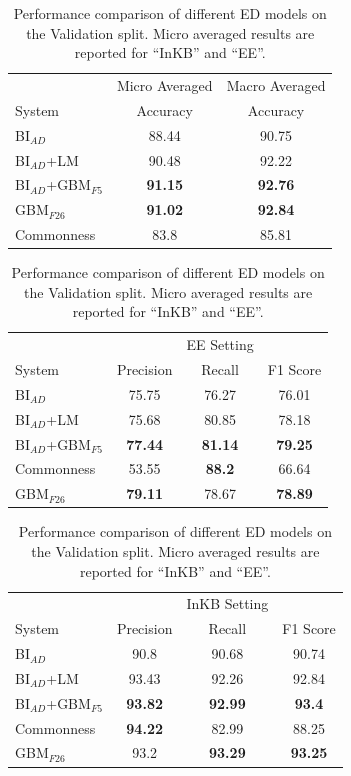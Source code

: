 \documentclass{report}
\theoremstyle{definition}
\theoremstyle{remark}
\begin{document}
\begin{table}
    \centering
    \begin{tabular}{lcc}
    &Micro Averaged & Macro Averaged\\
    System     & Accuracy &Accuracy \\
    \hline
    BI$_{AD}$   & 88.44&90.75\\
    BI$_{AD}$+LM& 90.48 &92.22\\
    BI$_{AD}$+GBM$_{F5}$ &\textbf{91.15} &\textbf{92.76}\\
    GBM$_{F26}$ & \textbf{91.02}&\textbf{92.84}\\
    Commonness  &83.8&85.81 \\
    \end{tabular}
    
    \vspace{0.5cm}\begin{tabular}{lccc}
    &&EE Setting & \\
    System    & Precision & Recall & F1 Score \\
    \hline
    BI$_{AD}$  &  75.75& 76.27&	76.01\\
    BI$_{AD}$+LM & 75.68& 80.85& 78.18\\
    BI$_{AD}$+GBM$_{F5}$ &\textbf{77.44}&\textbf{81.14} &\textbf{79.25}\\
    Commonness  & 53.55& \textbf{88.2}&	66.64 \\
    GBM$_{F26}$  & \textbf{79.11}& 78.67&	\textbf{78.89} \\
    \end{tabular}
    
    \vspace{0.5cm}\begin{tabular}{lccc}
    &&InKB Setting & \\
    System    & Precision & Recall & F1 Score \\
    \hline
    BI$_{AD}$   & 90.8&90.68&	90.74\\
    BI$_{AD}$+LM  & 93.43& 92.26& 92.84\\
    BI$_{AD}$+GBM$_{F5}$ &\textbf{93.82} &\textbf{92.99} &\textbf{93.4}\\
    Commonness  & \textbf{94.22}&82.99	&88.25 \\
     GBM$_{F26}$   & 93.2&\textbf{93.29}&	\textbf{93.25}\\
    \end{tabular}
       
    \caption{Performance comparison of different ED models on the Validation split. Micro averaged results are reported for ``InKB'' and ``EE''.}
    \label{tab:edresultsval}
\end{table}
\end{document}
